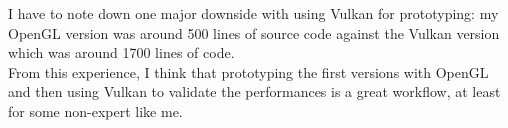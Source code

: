 \documentclass{article}
\begin{document}
I have to note down one major downside with using Vulkan for prototyping: my OpenGL version was around 500 lines of source code against the Vulkan version which was around 1700 lines of code.\\
From this experience, I think that prototyping the first versions with OpenGL and then using Vulkan to validate the performances is a great workflow, at least for some non-expert like me.

\newpage
\listoffigures
\end{document}
